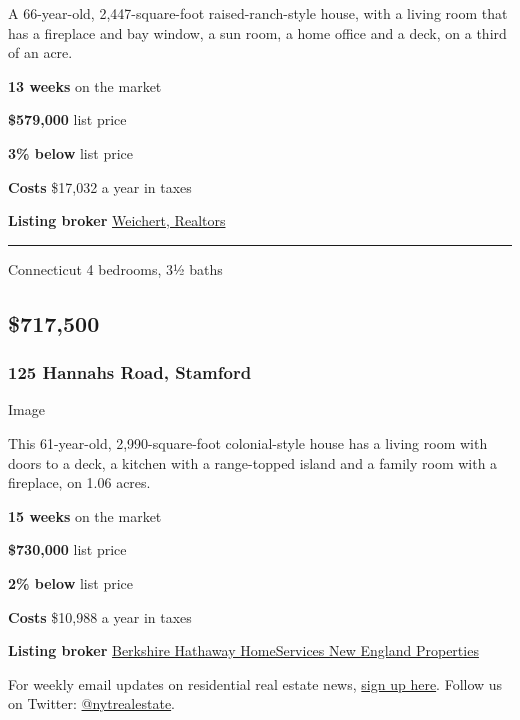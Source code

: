 A 66-year-old, 2,447-square-foot raised-ranch-style house, with a living
room that has a fireplace and bay window, a sun room, a home office and
a deck, on a third of an acre.

\textbf{13 weeks} on the market

\textbf{\$579,000} list price

\textbf{3\% below} list price

\textbf{Costs} \$17,032 a year in taxes

\textbf{Listing broker}
\href{https://www.zillow.com/homedetails/15-Rock-Spring-Rd-West-Orange-NJ-07052/38750723_zpid/}{Weichert,
Realtors}

\begin{center}\rule{0.5\linewidth}{\linethickness}\end{center}

Connecticut \textbar{} 4 bedrooms, 3½ baths

\hypertarget{717500}{%
\subsection{\$717,500}\label{717500}}

\hypertarget{125-hannahs-road-stamford}{%
\subsubsection{\texorpdfstring{\textbf{125 Hannahs Road,
Stamford}}{125 Hannahs Road, Stamford}}\label{125-hannahs-road-stamford}}

Image

This 61-year-old, 2,990-square-foot colonial-style house has a living
room with doors to a deck, a kitchen with a range-topped island and a
family room with a fireplace, on 1.06 acres.

\textbf{15 weeks} on the market

\textbf{\$730,000} list price

\textbf{2\% below} list price

\textbf{Costs} \$10,988 a year in taxes

\textbf{Listing broker}
\href{https://www.bhhsneproperties.com/single-family/smt/170282992/125-hannahs-road-stamford-ct-06903}{Berkshire
Hathaway HomeServices New England Properties}

For weekly email updates on residential real estate news,
\href{http://www.nytimes.com/newsletters/realestate/}{sign up here}.
Follow us on Twitter:
\href{https://twitter.com/nytrealestate}{@nytrealestate}.

